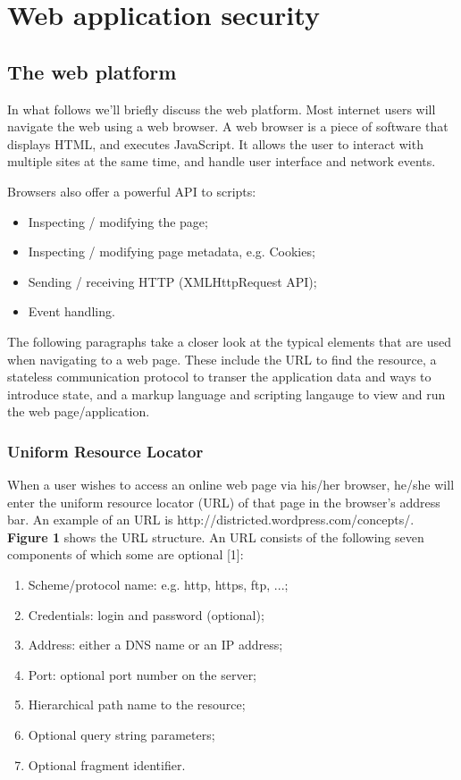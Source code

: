 \chapter{Web application security}\label{chapter:web-application-security}

\section{The web platform}

In what follows we'll briefly discuss the web platform. Most internet users will navigate the web using a web browser. A web browser is a piece of software that displays HTML, and executes JavaScript. It allows the user to interact with multiple sites at the same time, and handle user interface and network events.

Browsers also offer a powerful API to scripts:
\begin{itemize}
	\item Inspecting / modifying the page;
	\item Inspecting / modifying page metadata, e.g. Cookies;
	\item Sending / receiving HTTP (XMLHttpRequest API);
	\item Event handling.
\end{itemize}

The following paragraphs take a closer look at the typical elements that are used when navigating to a web page. These include the URL to find the resource, a stateless communication protocol to transer the application data and ways to introduce state, and a markup language and scripting langauge to view and run the web page/application.


\subsection{Uniform Resource Locator}

When a user wishes to access an online web page via his/her browser, he/she will enter the uniform resource locator (URL) of that page in the browser's address bar. An example of an URL is http://districted.wordpress.com/concepts/. \textbf{Figure 1} shows the URL structure. An URL consists of the following seven components of which some are optional [1]:
\begin{enumerate}
	\item Scheme/protocol name: e.g. http, https, ftp, ...;
	\item Credentials: login and password (optional);
	\item Address: either a DNS name or an IP address;
	\item Port: optional port number on the server;
	\item Hierarchical path name to the resource;
	\item Optional query string parameters;
	\item Optional fragment identifier.
\end{enumerate}


